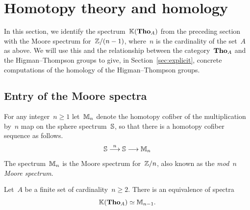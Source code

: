 

\section{Homotopy theory and homology}\label{sec:main}

In this section, we identify the spectrum~$\mathbb{K}(\mathbf{Tho}_A)$ from the preceding section with the Moore spectrum for~$\mathbb{Z}/(n-1)$, where~$n$ is the cardinality of the set~$A$ as above.  
We will use this and the relationship between the category~$\mathbf{Tho}_A$
and the Higman--Thompson groups to give, in
Section~\ref{sec:explicit}, concrete computations of the homology of
the Higman--Thompson groups.


\subsection{Entry of the Moore spectra}\label{sec:Moore}

For any integer~$n\geqslant 1$ let~$\mathbb{M}_n$ denote the homotopy cofiber of the multiplication by~$n$ map on the sphere spectrum~$\mathbb{S}$, so that there is a homotopy cofiber sequence as follows.
\begin{equation}\label{eq:cofib}
\mathbb{S}\overset{n}{\longrightarrow}\mathbb{S}\longrightarrow\mathbb{M}_n
\end{equation}
The spectrum~$\mathbb{M}_n$ is the Moore spectrum for~$\mathbb{Z}/n$, also known as the {\em mod~$n$ Moore spectrum}.

\begin{theorem}\label{thm:hocolim_is_Moore}
Let~$A$ be a finite set of cardinality~$n\geqslant 2$. There is an equivalence of spectra
\[
\mathbb{K}(\mathbf{Tho}_A)\simeq\mathbb{M}_{n-1}.
\]
\end{theorem}

